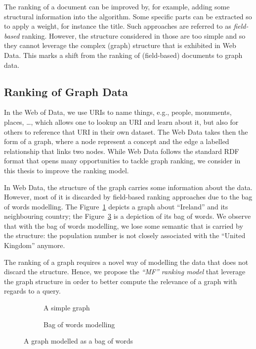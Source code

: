 The ranking of a document can be improved by, for example, adding some structural information into the algorithm. Some specific parts can be extracted so to apply a weight, for instance the title. Such approaches are referred to as \emph{\gls{field}-based} ranking. However, the structure considered in those are too simple and so they cannot leverage the complex (graph) structure that is exhibited in Web Data. This marks a shift from the ranking of (\gls{field}-based) documents to graph data.

\subsection{Ranking of Graph Data}

In the Web of Data, we use URIs to name things, e.g., people, monuments, places, \ldots, which allows one to lookup an URI and learn about it, but also for others to reference that URI in their own dataset. The Web Data takes then the form of a graph, where a node represent a concept and the edge a labelled relationship that links two nodes.
While Web Data follows the standard RDF format that opens many opportunities to tackle graph ranking, we consider in this thesis to improve the ranking model.

In Web Data, the structure of the graph carries some information about the data. However, most of it is discarded by \gls{field}-based ranking approaches due to the bag of words modelling. The Figure~\ref{chap1:introduction:fig:bow-graph} depicts a  graph about ``Ireland'' and its neighbouring country; the Figure~\ref{chap1:introduction:fig:bow} is a depiction of its bag of words. We observe that with the bag of words modelling, we lose some semantic that is carried by the structure: the population number is not closely associated with the ``United Kingdom'' anymore.

The ranking of a graph requires a novel way of modelling the data that does not discard the structure.
Hence, we propose the \emph{``MF'' ranking model} that leverage the graph structure in order to better compute the relevance of a graph with regards to a query.

\begin{figure}
	\centering
	\begin{subfigure}[b]{0.45\textwidth}
		\centering
		\resizebox{\textwidth}{!}{
			
		}
		\caption{A simple graph}
		\label{chap1:introduction:fig:bow-graph}
	\end{subfigure}
	\qquad
	\begin{subfigure}[b]{0.45\textwidth}
		\centering
		\resizebox{\textwidth}{!}{
			
		}
		\caption{Bag of words modelling}
		\label{chap1:introduction:fig:bow}
	\end{subfigure}
	\caption{A graph modelled as a bag of words}
\end{figure}

